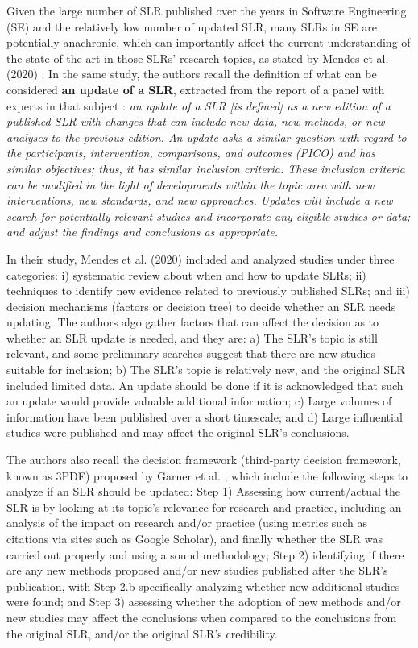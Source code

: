\documentclass[sigconf]{acmart}
\begin{document}
Given the large number of SLR published over the years in Software Engineering (SE) and the relatively low number of updated SLR, many SLRs in SE are potentially anachronic, which can importantly affect the current understanding of the state-of-the-art in those SLRs’ research topics, as stated by Mendes et al. (2020) \cite{Mendes2020}. In the same study, the authors recall the definition of what can be considered \textbf{an update of a SLR}, extracted from the report of a panel with experts in that subject \cite{garner2016and}: \textit{an update of a SLR [is defined] as a new edition of a published SLR with changes that can include new data, new methods, or new analyses to the previous edition. An update asks a similar question with regard to  the  participants,  intervention,  comparisons,  and  outcomes  (PICO)  and  has similar objectives; thus, it has similar inclusion criteria. These inclusion criteria can  be  modified  in  the  light  of  developments  within  the  topic  area  with  new interventions, new standards, and new approaches. Updates will include a new search  for  potentially  relevant  studies  and  incorporate  any  eligible  studies  or data; and adjust the findings and conclusions as appropriate.}

In their study, Mendes et al. (2020) \cite{Mendes2020} included and analyzed studies under three categories: i) systematic review about when and how to update SLRs; ii) techniques to identify new evidence related to previously published SLRs; and iii) 
decision mechanisms (factors or decision tree) to decide whether an SLR needs updating. The authors algo gather factors that can affect the decision as to whether an SLR update is needed, and they are: a) The SLR’s topic is still relevant, and some preliminary searches 
suggest that there are new studies suitable for inclusion; b) The SLR’s topic is relatively new, and the original SLR included limited data. An update should be done if it is acknowledged that such an update would provide valuable additional information; c)  Large volumes of information have been published over a short timescale; and d) Large  influential  studies  were  published  and  may  affect  the  original  SLR’s conclusions. 

The authors also recall the  decision framework (third-party  decision  framework, known as 3PDF) proposed by Garner et al. \cite{garner2016and}, which include the following steps to analyze if an SLR should be updated: Step 1) Assessing how current/actual the SLR is by looking at its topic’s relevance  for  research  and  practice, including an analysis of the impact  on research and/or practice (using metrics such as citations via sites such as Google Scholar), and finally whether the SLR was carried out properly and using a sound methodology; Step  2)  identifying  if  there  are  any  new  methods  proposed  and/or  new  studies published after the SLR’s publication, with Step 2.b specifically analyzing whether new additional studies were found; and Step 3) assessing whether the adoption of new methods and/or new studies may affect the conclusions when compared to the conclusions from the original SLR, and/or the original SLR’s credibility. 
\end{document}
